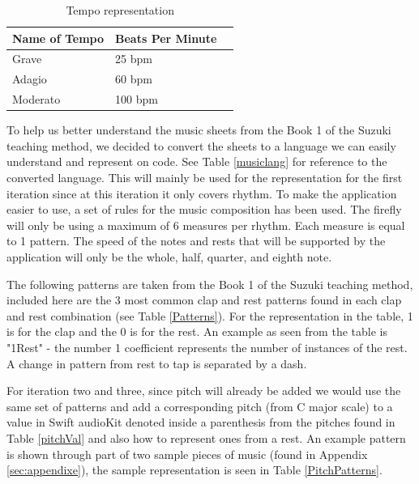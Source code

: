 \begin{table}[H]
\caption{Tempo representation}
\label{pitchRep}
\centering
\begin{tabular}{|l|l|r|} 
\hline
Name of Tempo & Beats Per Minute   \\ 
\hline
Grave                  & 25 bpm                     \\ 
\hline
Adagio                  & 60 bpm                      \\
\hline
Moderato                   & 100 bpm                       \\ 
\hline
\end{tabular}
\end{table}

To help us better understand the music sheets from the Book 1 of the Suzuki teaching method, we decided to convert the sheets to a language we can easily understand and represent on code. See Table \ref{musiclang} for reference to the converted language. This will mainly be used for the representation for the first iteration since at this iteration it only covers rhythm. To make the application easier to use, a set of rules for the music composition has been used. The firefly will only be using a maximum of 6 measures per rhythm. Each measure is equal to 1 pattern. The speed of the notes and rests that will be supported by the application will only be the whole, half, quarter, and eighth note.

The following patterns are taken from the Book 1 of the Suzuki teaching method, included here are the 3 most common clap and rest patterns found in each clap and rest combination (see Table \ref{Patterns}). For the representation in the table, 1 is for the clap and the 0 is for the rest. An example as seen from the table is "1Rest" - the number 1 coefficient represents the number of instances of the rest. A change in pattern from rest to tap is separated by a dash. 

For iteration two and three, since pitch will already be added we would use the same set of patterns and add a corresponding pitch (from C major scale) to a value in Swift audioKit denoted inside a parenthesis from the pitches found in Table \ref{pitchVal} and also how to represent ones from a rest. An example pattern is shown through part of two sample pieces of music (found in Appendix \ref{sec:appendixe}), the sample representation is seen in Table \ref{PitchPatterns}.

